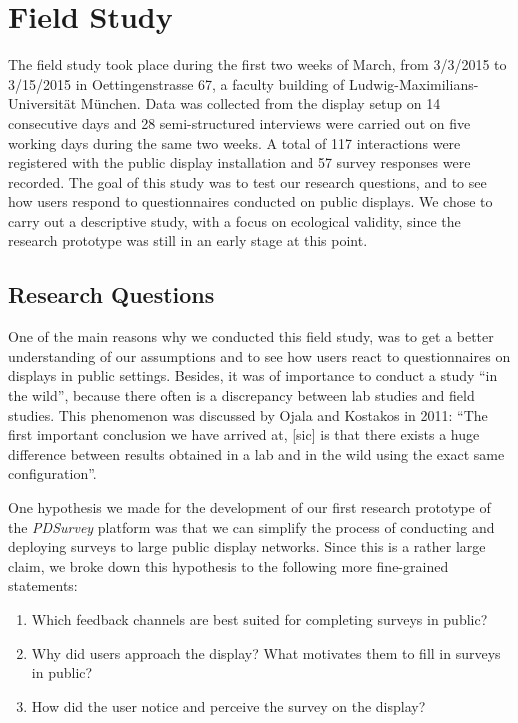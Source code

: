 \section{Field Study}
\label{chapter:field-study}


	The field study took place during the first two weeks of March, from 3/3/2015 to 3/15/2015 in Oettingenstrasse 67, a faculty building of Ludwig-Maximilians-Universit\"at M\"unchen. Data was collected from the display setup on 14 consecutive days and 28 semi-structured interviews were carried out on five working days during the same two weeks. A total of 117 interactions were registered with the public display installation and 57 survey responses were recorded.
	The goal of this study was to test our research questions, and to see how users respond to questionnaires conducted on public displays. We chose to carry out a descriptive study, with a focus on ecological validity, since the research prototype was still in an early stage at this point.




\subsection{Research Questions}

	One of the main reasons why we conducted this field study, was to get a better understanding of our assumptions and to see how users react to questionnaires on displays in public settings. Besides, it was of importance to conduct a study ``in the wild'', because there often is a discrepancy between lab studies and field studies. This phenomenon was discussed by Ojala and Kostakos in 2011: ``The first important conclusion we have arrived at, [sic] is that there exists a huge difference between results obtained in a lab and in the wild using the exact same configuration''\cite{Ojala2011}.

	One hypothesis we made for the development of our first research prototype of the \textit{PDSurvey} platform was that we can simplify the process of conducting and deploying surveys to large public display networks. Since this is a rather large claim, we broke down this hypothesis to the following more fine-grained statements:

	\begin{enumerate}
		\item Which feedback channels are best suited for completing surveys in public?
		\item Why did users approach the display? What motivates them to fill in surveys in public? 
		\item How did the user notice and perceive the survey on the display?
	\end{enumerate}

